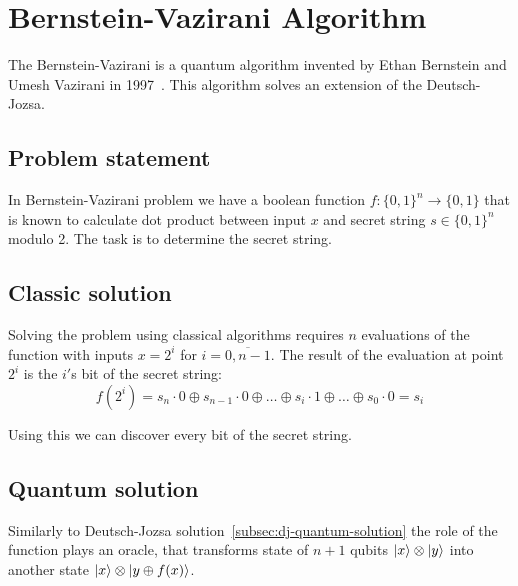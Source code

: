 \section{Bernstein-Vazirani Algorithm}

The Bernstein-Vazirani is a quantum algorithm invented by Ethan Bernstein and Umesh Vazirani in 1997~\cite{BernsteinVazirani}.
This algorithm solves an extension of the Deutsch-Jozsa.

\subsection{Problem statement}

In Bernstein-Vazirani problem we have a boolean function $f:\{0, 1\}^n \rightarrow \{0, 1\}$ that is known to calculate dot product between input $x$ and secret string $s \in \{0, 1\}^n$ modulo 2.
The task is to determine the secret string.

\subsection{Classic solution}

Solving the problem using classical algorithms requires $n$ evaluations of the function with inputs $x = 2^i$ for $i=\overline{0,n-1}$.
The result of the evaluation at point $2^i$ is the $i'$s bit of the secret string:
\[
    f(2^i) = s_n\cdot0\oplus s_{n-1}\cdot0\oplus\ldots\oplus s_{i}\cdot1\oplus\ldots\oplus s_{0}\cdot0 = s_i
\]

Using this we can discover every bit of the secret string.

\subsection{Quantum solution}

Similarly to Deutsch-Jozsa solution~\eqref{subsec:dj-quantum-solution} the role of the function plays an oracle, that transforms state of $n+1$ qubits $\ket{x}\otimes\ket{y}$ into another state $\ket{x}\otimes\ket{y\oplus f(x)}$.

